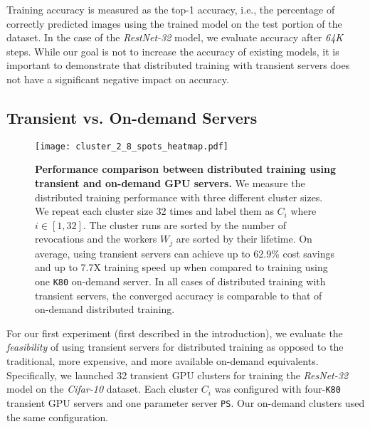 Training accuracy is measured as the top-1 accuracy, i.e., the percentage of
correctly predicted images using the trained model on the test portion of the
dataset. In the case of the \emph{RestNet-32} model, we evaluate accuracy after
\emph{64K} steps. While our goal is not to increase the accuracy of existing models,
it is important to demonstrate that distributed training with transient servers
does not have a significant negative impact on accuracy. 






\subsection{Transient vs. On-demand Servers}
\label{subsec:trans_v_ondemand}


\begin{figure}[t]
\centering
    \texttt{[image: cluster\_2\_8\_spots\_heatmap.pdf]}
\caption{\textbf{Performance comparison between distributed training using transient and on-demand GPU servers.} 
We measure the distributed training performance with three different cluster sizes. We repeat each cluster size 32 times and label them as $C_i$ where $i \in [1, 32]$. 
The cluster runs are sorted by the number of revocations and the workers $W_j$ are sorted by their lifetime. 
On average, using transient servers can achieve up to 62.9\% cost savings and up to 7.7X training speed up when compared to training using one \texttt{K80} on-demand server. 
In all cases of distributed training with transient servers, the converged accuracy is comparable to that of on-demand distributed training.}
    \label{eval:dist_transient_2_8}
\end{figure}


For our first experiment (first described in the introduction), we evaluate the
\emph{feasibility} of using transient servers for distributed training as opposed to
the traditional, more expensive, and more available on-demand equivalents.
Specifically, we launched 32 transient GPU clusters for training the
\emph{ResNet-32} model on the \emph{Cifar-10} dataset. Each cluster $C_i$ was configured with
four-\texttt{K80} transient GPU servers and one parameter server \texttt{PS}. Our on-demand
clusters used the same configuration. 

